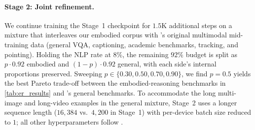 \paragraph{Stage 2: Joint refinement.}
We continue training the Stage~1 checkpoint for $1.5$K additional steps on a mixture that interleaves our embodied corpus with \molmot's original multimodal mid-training data (general VQA, captioning, academic benchmarks, tracking, and \molmot pointing). Holding the NLP rate at $8\%$, the remaining $92\%$ budget is split as $p \cdot 0.92$ embodied and $(1-p) \cdot 0.92$ general, with each side's internal proportions preserved. Sweeping $p \in \{0.30, 0.50, 0.70, 0.90\}$, we find $p = 0.5$ yields the best Pareto trade-off between the embodied-reasoning benchmarks in \autoref{tab:er_results} and \molmot's general benchmarks. To accommodate the long multi-image and long-video examples in the general mixture, Stage~2 uses a longer sequence length ($16{,}384$ vs.~$4{,}200$ in Stage~1) with per-device batch size reduced to $1$; all other hyperparameters follow \molmot.
